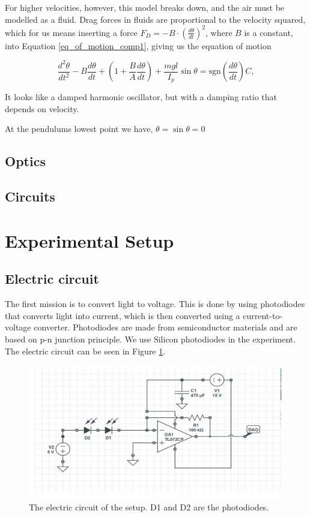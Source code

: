 \documentclass[11pt, a4paper]{article}
\begin{document}
For higher velocities, however, this model breaks down, and the air must be
modelled as a fluid. Drag forces in fluids are proportional to the velocity
squared\cite{drag}, which for us means inserting a force 
$F_D = -B\cdot \left(\frac{d\theta}{dt}\right)^2$, where $B$ is a constant,
into Equation \ref{eq_of_motion_comp1}, giving us the equation of motion

\begin{equation}
    \frac{d^2\theta}{dt^2} 
  - B \frac{d\theta}{dt}
  + \left(1 + \frac{B}{A} \frac{d\theta}{dt} \right)  
  + \frac{mgl}{I_p}\sin{\theta} = \text{sgn}(\frac{d\theta}{dt})C,
  \label{eq_of_motion_comp2}
\end{equation}

It looks like a damped harmonic oscillator, but with a
damping ratio that depends on velocity. 

At the pendulums lowest point we have, $\theta = \sin{\theta} = 0$



\subsection{Optics}
\subsection{Circuits}


\section{Experimental Setup}
\subsection{Electric circuit}
The first mission is to convert light to voltage. This is done by using photodiodes that converts light into current, which is then converted using a current-to-voltage converter.
Photodiodes are made from semiconductor materials and are based on p-n junction principle. We use Silicon photodiodes in the experiment. The electric circuit can be seen in Figure \ref{f:circuit}.
\begin{figure}[h]
	\centering
	\includegraphics{circuit}
	\caption{The electric circuit of the setup. D1 and D2 are the photodiodes.}
	\label{f:circuit}
\end{figure}
\end{document}
